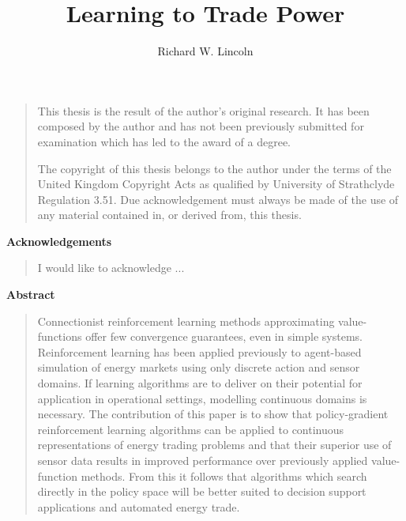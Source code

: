 \documentclass{strath_thesis}
\title{Learning to Trade Power}
\author{Richard W. Lincoln}
\begin{document}
\maketitle
\newpage

\setcounter{page}{1}

\thispagestyle{plain}
\begin{quote}
This thesis is the result of the author's original research.  It has been
composed by the author and has not been previously submitted for examination
which has led to the award of a degree.

The copyright of this thesis belongs to the author under the terms of the
United Kingdom Copyright Acts as qualified by University of Strathclyde
Regulation 3.51. Due acknowledgement must always be made of the use of any
material contained in, or derived from, this thesis.

\end{quote}
\newpage

\thispagestyle{plain}
\begin{center}
\vspace*{1.5cm}
{\Large \bfseries Acknowledgements}
\end{center}
\vspace{0.5cm}
\begin{quote}
I would like to acknowledge ...
\end{quote}
\newpage

\thispagestyle{plain}
\begin{center}
  \vspace*{1.5cm}
  {\Large \bfseries  Abstract}
\end{center}
\vspace{0.5cm}
\begin{quote}
Connectionist reinforcement learning methods approximating value-functions
offer few convergence guarantees, even in simple systems.  Reinforcement
learning has been applied previously to agent-based simulation of energy
markets using only discrete action and sensor domains. If learning algorithms
are to deliver on their potential for application in operational settings,
modelling continuous domains is necessary.  The contribution of this paper is
to show that policy-gradient reinforcement learning algorithms can be applied
to continuous representations of energy trading problems and that their
superior use of sensor data results in improved performance over previously
applied value-function methods.  From this it follows that algorithms which
search directly in the policy space will be better suited to decision support
applications and automated energy trade.
\end{quote}
\end{document}
